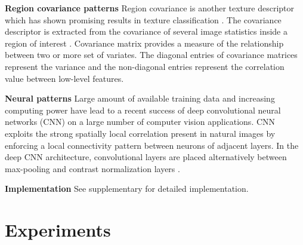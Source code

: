 \documentclass[10pt,twocolumn,letterpaper]{article}
\renewcommand{\paragraph}{\textbf}
\begin{document}
%
%
%
%
%
%
%
%
%
%
%
%
%
%
%
%
%
%
%
%
%
%
%



\paragraph{Region covariance patterns}
Region covariance is another texture descriptor which has
shown promising results in texture classification \cite{Tuzel2006Region}.
The covariance descriptor is extracted from the covariance
of several image statistics inside a region of interest \cite{Tuzel2006Region}.
Covariance matrix provides a measure of the relationship between
two or more set of variates.
The diagonal entries of covariance matrices represent the variance
and the non-diagonal entries represent the correlation value
between low-level features.


%
%
%
%
%
%
%
%
%
%
%
%
%
%
%


\paragraph{Neural patterns}
%
%
Large amount of available training data and
increasing computing power have lead to
a recent success of deep
convolutional neural networks (CNN)
on a large number of computer vision applications.
%
%
%
%
%
%
CNN exploits the strong spatially local correlation present in
natural images by enforcing a local connectivity pattern
between neurons of adjacent layers.
%
%
%
In the deep CNN architecture, convolutional layers are placed
alternatively between max-pooling and contrast
normalization layers \cite{Krizhevsky2012Imagenet}.

%
%
%
%
%
%
%
%
%
%
%
%
%
%
%
%
%
%
%
%
%
%
%
%
%
%
%
%
%
%
%
%
%
%

\paragraph{Implementation}
See supplementary for detailed implementation.

%
\section{Experiments}
%
%
%
%
\end{document}
